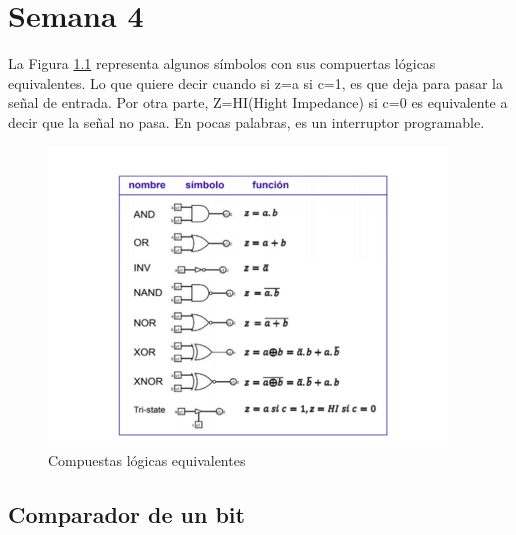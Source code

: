 \documentclass[12pt,letterpaper]{book}
\begin{document}
\chapter{Semana 4}
La Figura \ref{p1} representa algunos símbolos con sus compuertas lógicas equivalentes. Lo que quiere decir cuando si z=a si c=1, es que deja para pasar la señal de entrada. Por otra parte, Z=HI(Hight Impedance) si c=0 es equivalente a decir que la señal no pasa. En pocas palabras, es un interruptor programable.

\begin{figure}[H]
\centering
\includegraphics[width=1\linewidth]{figures/p1.png}
\caption{Compuestas lógicas equivalentes}
\label{p1}
\end{figure}
\vspace{0.2cm}

\section{Comparador de un bit}
\end{document}
